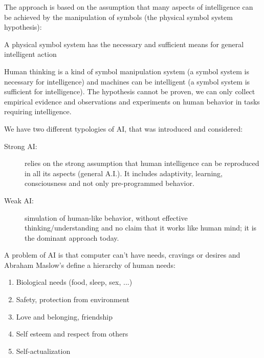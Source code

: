 The approach is based on the assumption that many aspects of intelligence can be achieved by the 
manipulation of symbols (the physical symbol system hypothesis):
\begin{defi}
A physical symbol system has the necessary and sufficient means for general intelligent action
\end{defi}%
Human thinking is a kind of symbol manipulation system (a symbol system is necessary for intelligence) and 
machines can be intelligent (a symbol system is sufficient for intelligence).\newline
The hypothesis cannot be proven, we can only collect empirical evidence and observations and experiments
on human behavior in tasks requiring intelligence.

We have two different typologies of AI, that was introduced and considered:
\begin{description}
    \item [Strong AI: ] relies on the strong assumption that human intelligence can be reproduced
                        in all its aspects (general A.I.).\newline
                        It includes adaptivity, learning, consciousness and not only pre-programmed behavior.
    \item [Weak AI: ]   simulation of human-like behavior, without effective thinking/understanding and 
                        no claim that it works like human mind; it is the dominant approach today.
\end{description}
A problem of AI is that computer can't have needs, cravings or desires and Abraham Maslow's define 
a hierarchy of human needs:
\begin{enumerate}
    \item Biological needs (food, sleep, sex, ...)
    \item Safety, protection from environment
    \item Love and belonging, friendship
    \item Self esteem and respect from others
    \item Self-actualization
\end{enumerate}
